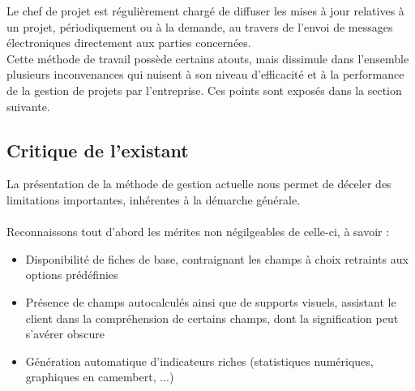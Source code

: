 \begin{spacing}{1.5}
Le chef de projet est régulièrement chargé de diffuser les mises à jour relatives à un projet, périodiquement ou à la demande, au travers de l'envoi de messages électroniques directement aux parties concernées.\\

Cette méthode de travail possède certains atouts, mais dissimule dans l'ensemble plusieurs inconvenances qui nuisent à son niveau d'efficacité et à la performance de la gestion de projets par l'entreprise. Ces points sont exposés dans la section suivante.

\subsection{Critique de l'existant}
La présentation de la méthode de gestion actuelle nous permet de déceler des limitations importantes, inhérentes à la démarche générale.\\
\\
Reconnaissons tout d'abord les mérites non négilgeables de celle-ci, à savoir :
\begin{itemize}
    \item Disponibilité de fiches de base, contraignant les champs à choix retraints aux options prédéfinies
    \item Présence de champs autocalculés ainsi que de supports visuels, assistant le client dans la compréhension de certains champs, dont la signification peut s'avérer obscure
    \item Génération automatique d'indicateurs riches (statistiques numériques, graphiques en camembert, ...)
\end{itemize}
\


\end{spacing}
